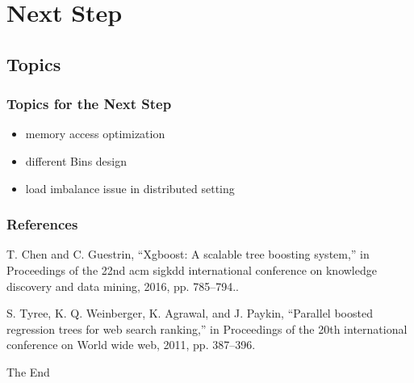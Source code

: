 \documentclass{beamer}
\begin{document}
\section{Next Step} %
\subsection{Topics} 
\begin{frame}
	\frametitle{Topics for the Next Step}
	\begin{itemize}
		\item memory access optimization
		\item different Bins design
		\item load imbalance issue in distributed setting		
	\end{itemize}
\end{frame}





\begin{frame}
\frametitle{References}
\footnotesize{
\begin{thebibliography}{99} %

T. Chen and C. Guestrin, “Xgboost: A scalable tree boosting system,” in Proceedings of the 22nd acm sigkdd international conference on knowledge discovery and data mining, 2016, pp. 785--794..

S. Tyree, K. Q. Weinberger, K. Agrawal, and J. Paykin, “Parallel boosted regression trees for web search ranking,” in Proceedings of the 20th international conference on World wide web, 2011, pp. 387--396.

\end{thebibliography}
}
\end{frame}




\begin{frame}
\Huge{\centerline{The End}}
\end{frame}

\end{document}
